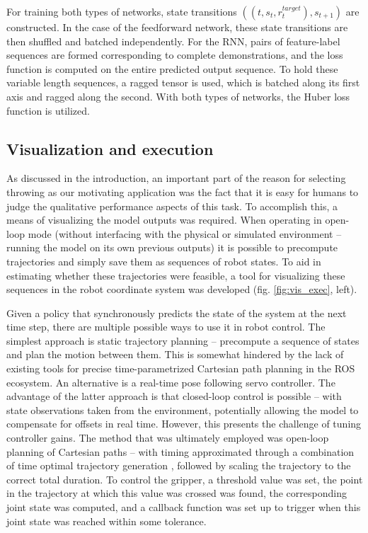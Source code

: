 \documentclass{article}
\begin{document}
For training both types of networks, state transitions $\left(\left(t,s_t,r^{target}_t\right), s_{t+1}\right)$ are constructed. In the case of the feedforward network, these state transitions are then shuffled and batched independently. For the RNN, pairs of feature-label sequences are formed corresponding to complete demonstrations, and the loss function is computed on the entire predicted output sequence. To hold these variable length sequences, a ragged tensor is used, which is batched along its first axis and ragged along the second. With both types of networks, the Huber loss function is utilized.

\subsection{Visualization and execution}
\label{sec:exec}

As discussed in the introduction, an important part of the reason for selecting throwing as our motivating application was the fact that it is easy for humans to judge the qualitative performance aspects of this task. To accomplish this, a means of visualizing the model outputs was required. When operating in open-loop mode (without interfacing with the physical or simulated environment -- running the model on its own previous outputs) it is possible to precompute trajectories and simply save them as sequences of robot states. To aid in estimating whether these trajectories were feasible, a tool for visualizing these sequences in the robot coordinate system was developed (fig. \ref{fig:vis_exec}, left).

Given a policy that synchronously predicts the state of the system at the next time step, there are multiple possible ways to use it in robot control. The simplest approach is static trajectory planning -- precompute a sequence of states and plan the motion between them. This is somewhat hindered by the lack of existing tools for precise time-parametrized Cartesian path planning in the ROS ecosystem. An alternative is a real-time pose following servo controller. The advantage of the latter approach is that closed-loop control is possible -- with state observations taken from the environment, potentially allowing the model to compensate for offsets in real time. However, this presents the challenge of tuning controller gains. The method that was ultimately employed was open-loop planning of Cartesian paths -- with timing approximated through a combination of time optimal trajectory generation \citep{kunz2012time}, followed by scaling the trajectory to the correct total duration. To control the gripper, a threshold value was set, the point in the trajectory at which this value was crossed was found, the corresponding joint state was computed, and a callback function was set up to trigger when this joint state was reached within some tolerance.
\end{document}
